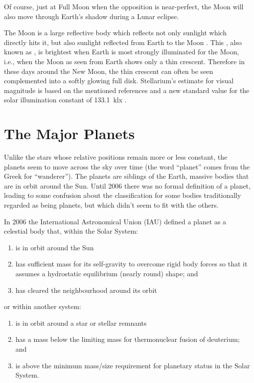 Of course, just at Full Moon when the opposition is near-perfect, the
Moon will also move through Earth's shadow during a Lunar eclipse.

The Moon is a large reflective body which reflects not only sunlight
which directly hits it, but also sunlight reflected from Earth to the
Moon \citep{Agrawal:2016}. This , also known as
, is brightest when Earth is most strongly
illuminated for the Moon, i.e., when the Moon as seen from Earth shows
only a thin crescent. Therefore in these days around the New Moon, the
thin crescent can often be seen complemented into a softly glowing
full disk.  Stellarium's estimate for visual
magnitude is based on the mentioned references and a new standard 
value for the solar illumination constant of 133.1~klx \citep{Ashdown:2019}.


\section{The Major Planets}
\label{sec:Planets}

Unlike the stars whose relative positions remain more or less constant,
the planets seem to move across the sky over time (the word ``planet''
comes from the Greek for ``wanderer''). The planets are siblings of the Earth,
massive bodies that are in orbit around the Sun. Until 2006 there was no
formal definition of a planet, leading to some confusion about the
classification for some bodies traditionally regarded as being planets, but
which didn't seem to fit with the others.

In 2006 the International Astronomical Union (IAU) defined a planet as a
celestial body that, within the Solar System:

\begin{enumerate}
\item
  is in orbit around the Sun
\item
  has sufficient mass for its self-gravity to overcome rigid body forces
  so that it assumes a hydrostatic equilibrium (nearly round) shape; and
\item
  has cleared the neighbourhood around its orbit
\end{enumerate}

or within another system:

\begin{enumerate}
\item
  is in orbit around a star or stellar remnants
\item
  has a mass below the limiting mass for thermonuclear fusion of
  deuterium; and
\item
  is above the minimum mass/size requirement for planetary status in the
  Solar System.
\end{enumerate}

